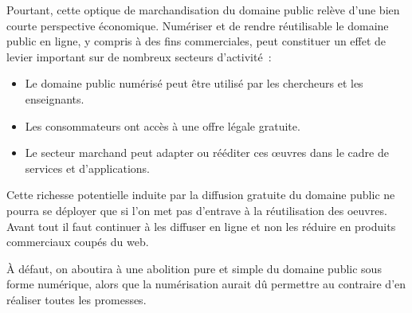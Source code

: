 Pourtant, cette optique de marchandisation du domaine public relève d’une bien courte perspective économique. Numériser et de rendre réutilisable le domaine public en ligne, y compris à des fins commerciales, peut constituer un effet de levier important sur de nombreux secteurs d’activité~: 

\begin{itemize}
\item Le domaine public numérisé peut être utilisé par les chercheurs et les enseignants.
\item Les consommateurs ont accès à une offre légale gratuite.
\item Le secteur marchand peut adapter ou rééditer ces œuvres dans le cadre de services et d’applications.
\end{itemize}

Cette richesse potentielle induite par la diffusion gratuite du domaine public ne pourra se déployer que si l’on met pas d’entrave à la réutilisation des oeuvres. Avant tout il faut continuer à les diffuser en ligne et non les réduire en produits commerciaux coupés du web.

À défaut, on aboutira à une abolition pure et simple du domaine public sous forme numérique, alors que la numérisation aurait dû permettre au contraire d’en réaliser toutes les promesses.
